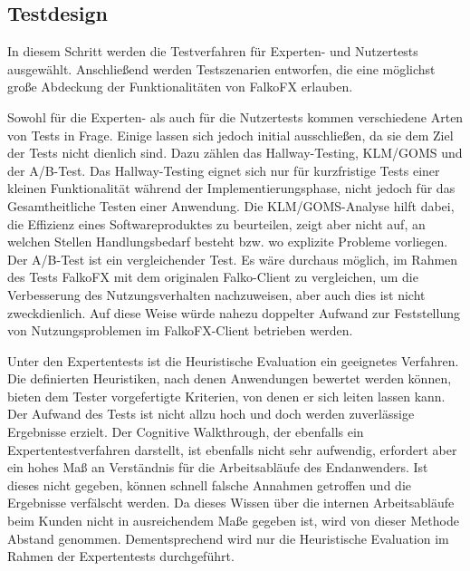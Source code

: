 \subsection{Testdesign}
In diesem Schritt werden die Testverfahren für Experten- und Nutzertests ausgewählt. Anschließend werden Testszenarien entworfen, die eine möglichst große Abdeckung der Funktionalitäten von FalkoFX erlauben.\par
{}
Sowohl für die Experten- als auch für die Nutzertests kommen verschiedene Arten von Tests in Frage. Einige lassen sich jedoch initial ausschließen, da sie dem Ziel der Tests nicht dienlich sind. Dazu zählen das Hallway-Testing, KLM/GOMS und der A/B-Test. Das Hallway-Testing eignet sich nur für kurzfristige Tests einer kleinen Funktionalität während der Implementierungsphase, nicht jedoch für das Gesamtheitliche Testen einer Anwendung. Die KLM/GOMS-Analyse hilft dabei, die Effizienz eines Softwareproduktes zu beurteilen, zeigt aber nicht auf, an welchen Stellen Handlungsbedarf besteht bzw. wo explizite Probleme vorliegen. Der A/B-Test ist ein vergleichender Test. Es wäre durchaus möglich, im Rahmen des Tests FalkoFX mit dem originalen Falko-Client zu vergleichen, um die Verbesserung des Nutzungsverhalten nachzuweisen, aber auch dies ist nicht zweckdienlich. Auf diese Weise würde nahezu doppelter Aufwand zur Feststellung von Nutzungsproblemen im FalkoFX-Client betrieben werden.\par
Unter den Expertentests ist die Heuristische Evaluation ein geeignetes Verfahren. Die definierten Heuristiken, nach denen Anwendungen bewertet werden können, bieten dem Tester vorgefertigte Kriterien, von denen er sich leiten lassen kann. Der Aufwand des Tests ist nicht allzu hoch und doch werden zuverlässige Ergebnisse erzielt. Der Cognitive Walkthrough, der ebenfalls ein Expertentestverfahren darstellt, ist ebenfalls nicht sehr aufwendig, erfordert aber ein hohes Maß an Verständnis für die Arbeitsabläufe des Endanwenders. Ist dieses nicht gegeben, können schnell falsche Annahmen getroffen und die Ergebnisse verfälscht werden. Da dieses Wissen über die internen Arbeitsabläufe beim Kunden nicht in ausreichendem Maße gegeben ist, wird von dieser Methode Abstand genommen. Dementsprechend wird nur die Heuristische Evaluation im Rahmen der Expertentests durchgeführt.\par
